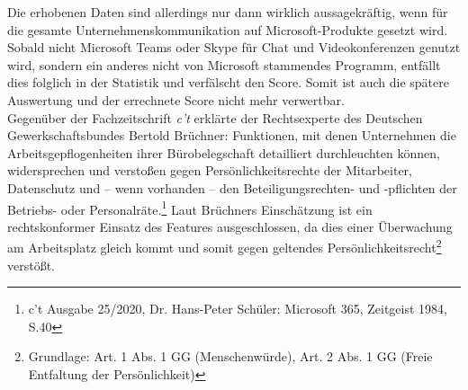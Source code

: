Die erhobenen Daten sind allerdings nur dann wirklich aussagekräftig, wenn für die gesamte Unternehmenskommunikation auf Microsoft-Produkte gesetzt wird. Sobald nicht Microsoft Teams oder Skype für Chat und Videokonferenzen genutzt wird, sondern ein anderes nicht von Microsoft stammendes Programm, entfällt dies folglich in der Statistik und verfälscht den Score. Somit ist auch die spätere Auswertung und der errechnete Score nicht mehr verwertbar.\\

Gegenüber der Fachzeitschrift \textit{c't} erklärte der Rechtsexperte des Deutschen Gewerkschaftsbundes Bertold Brüchner: \glqq Funktionen, mit denen Unternehmen die Arbeitsgepflogenheiten ihrer Bürobelegschaft detailliert durchleuchten können, widersprechen und verstoßen gegen Persönlichkeitsrechte der Mitarbeiter, Datenschutz und – wenn vorhanden – den Beteiligungsrechten- und -pflichten der Betriebs- oder Personalräte.\grqq{}\footnote{c't Ausgabe 25/2020, Dr. Hans-Peter Schüler: \glqq Microsoft 365, Zeitgeist 1984\grqq{}, S.40} Laut Brüchners Einschätzung ist ein rechtskonformer Einsatz des Features ausgeschlossen, da dies einer Überwachung am Arbeitsplatz gleich kommt und somit gegen geltendes Persönlichkeitsrecht\footnote{Grundlage: Art. 1 Abs. 1 GG (Menschenwürde), Art. 2 Abs. 1 GG (Freie Entfaltung der Persönlichkeit)} verstößt.\\

\vfill